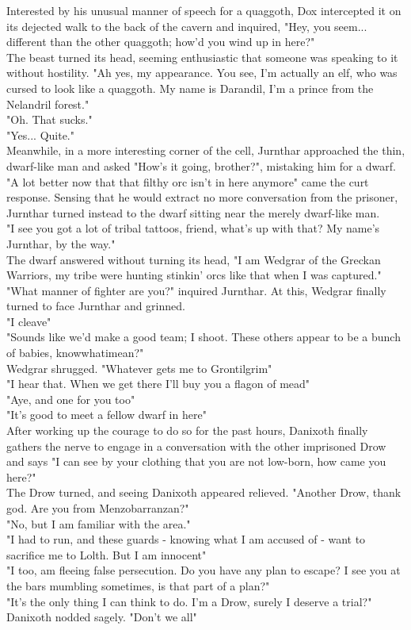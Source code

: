 \documentclass[letterpaper,10pt,twoside,twocolumn,openany]{book}
\begin{document}
Interested by his unusual manner of speech for a quaggoth, Dox intercepted it on its dejected walk to the back of the cavern and inquired, "Hey, you seem... different than the other quaggoth; how'd you wind up in here?"\\
The beast turned its head, seeming enthusiastic that someone was speaking to it without hostility. "Ah yes, my appearance. You see, I'm actually an elf, who was cursed to look like a quaggoth. My name is Darandil, I'm a prince from the Nelandril forest."\\
"Oh. That sucks."\\
"Yes... Quite."\\

Meanwhile, in a more interesting corner of the cell, Jurnthar approached the thin, dwarf-like man and asked "How's it going, brother?", mistaking him for a dwarf. "A lot better now that that filthy orc isn't in here anymore" came the curt response.
Sensing that he would extract no more conversation from the prisoner, Jurnthar turned instead to the dwarf sitting near the merely dwarf-like man.\\
"I see you got a lot of tribal tattoos, friend, what's up with that? My name's Jurnthar, by the way."\\
The dwarf answered without turning its head, "I am Wedgrar of the Greckan Warriors, my tribe were hunting stinkin' orcs like that when I was captured."\\
"What manner of fighter are you?" inquired Jurnthar. At this, Wedgrar finally turned to face Jurnthar and grinned.\\
"I cleave"\\
"Sounds like we'd make a good team; I shoot. These others appear to be a bunch of babies, knowwhatimean?"\\
Wedgrar shrugged. "Whatever gets me to Grontilgrim"\\
"I hear that. When we get there I'll buy you a flagon of mead"\\
"Aye, and one for you too"\\
"It's good to meet a fellow dwarf in here"\\

After working up the courage to do so for the past hours, Danixoth finally gathers the nerve to engage in a conversation with the other imprisoned Drow and says "I can see by your clothing that you are not low-born, how came you here?"\\
The Drow turned, and seeing Danixoth appeared relieved. "Another Drow, thank god. Are you from Menzobarranzan?"\\
"No, but I am familiar with the area."\\
"I had to run, and these guards - knowing what I am accused of - want to sacrifice me to Lolth. But I am innocent"\\
"I too, am fleeing false persecution. Do you have any plan to escape? I see you at the bars mumbling sometimes, is that part of a plan?"\\
"It's the only thing I can think to do. I'm a Drow, surely I deserve a trial?"\\
Danixoth nodded sagely. "Don't we all"\\
\end{document}
